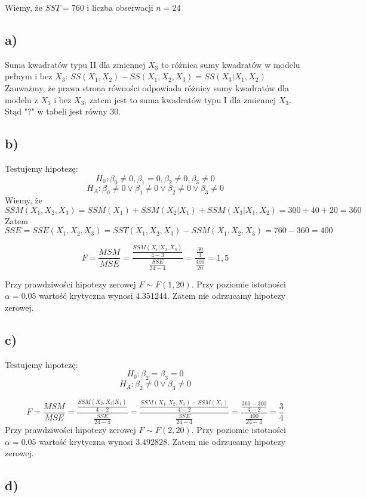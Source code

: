 \documentclass[9pt]{article}  %
\begin{document}
  Wiemy, że $SST = 760$ i liczba obserwacji $n= 24$


  \subsection{a)}
  Suma kwadratów typu II dla zmiennej $X_3$ to różnica sumy kwadratów w modelu pełnym i bez $X_3$:\newline
  $SS(X_1, X_2) - SS(X_1, X_2, X_3)  = SS(X_3 | X_1, X_2)$ \newline
  Zauważmy, że prawa strona równości odpowiada różnicy sumy kwadratów dla modelu z $X_3$ i bez $X_3$, zatem jest to suma kwadratów typu I dla zmiennej $X_3$. Stąd "?" w tabeli jest równy 30.
  
  
  \subsection{b)}
  Testujemy hipotezę:
  $$H_0: \beta_0 \ne 0, \beta_1 =0, \beta_2 \ne 0, \beta_3 \ne 0 $$
  $$H_A: \beta_0 \ne 0 \vee \beta_1 \ne 0 \vee \beta_2 \ne 0 \vee \beta_3 \ne 0$$
   Wiemy, że $$SSM(X_1, X_2, X_3) = SSM(X_1) + SSM(X_2 | X_1) + SSM(X_3 | X_1, X_2) = 300 + 40 + 20 = 360$$
   Zatem
   $$ SSE = SSE(X_1, X_2, X_3) = SST(X_1, X_2, X_3) - SSM(X_1, X_2, X_3) = 760 - 360 = 400 $$
  
  $$F = \frac{MSM}{MSE} = \frac{ \frac{SSM(X_1 | X_2, X_3)}{4-3}  }{ \frac{SSE}{24-4} } = 
  \frac{ \frac{30}{1}  }{ \frac{400}{20} } = 1,5$$
  
  Przy prawdziwości hipotezy zerowej $F \sim F(1,20)$. Przy poziomie istotności $\alpha = 0.05$ wartość krytyczna wynosi $4.351244$. Zatem nie odrzucamy hipotezy zerowej.
  
  
  \subsection{c)}
    Testujemy hipotezę:
  $$H_0: \beta_2= \beta_3 = 0$$
  $$H_A: \beta_2 \ne 0 \vee \beta_3 \ne 0 $$
  
  $$F = \frac{MSM}{MSE} = \frac{ \frac{SSM(X_2, X_3 | X_1)}{4-2}  }{ \frac{SSE}{24-4} } = \frac{ \frac{ SSM(X_1, X_2, X_3) - SSM(X_1) }{4-2}  }{ \frac{SSE}{24-4} } = \frac{ \frac{ 360-300 }{4-2}  }{ \frac{400}{24-4} } = \frac{3}{4}$$
    Przy prawdziwości hipotezy zerowej $F \sim F(2,20)$. Przy poziomie istotności $\alpha = 0.05$ wartość krytyczna wynosi $3.492828$. Zatem nie odrzucamy hipotezy zerowej.
  
  
  \subsection{d)}
  
\end{document}

